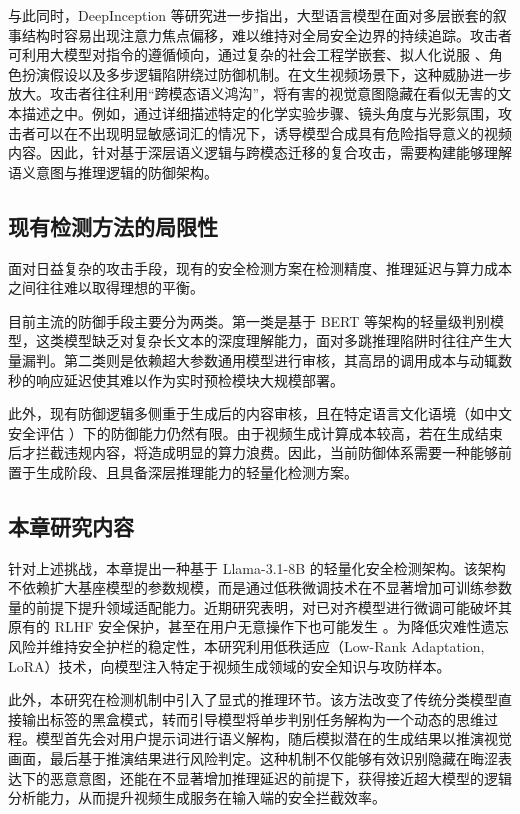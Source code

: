 与此同时，DeepInception 等研究进一步指出，大型语言模型在面对多层嵌套的叙事结构时容易出现注意力焦点偏移，难以维持对全局安全边界的持续追踪。攻击者可利用大模型对指令的遵循倾向，通过复杂的社会工程学嵌套、拟人化说服 \cite{zeng2024johnny}、角色扮演假设以及多步逻辑陷阱绕过防御机制。在文生视频场景下，这种威胁进一步放大。攻击者往往利用“跨模态语义鸿沟”，将有害的视觉意图隐藏在看似无害的文本描述之中。例如，通过详细描述特定的化学实验步骤、镜头角度与光影氛围，攻击者可以在不出现明显敏感词汇的情况下，诱导模型合成具有危险指导意义的视频内容。因此，针对基于深层语义逻辑与跨模态迁移的复合攻击，需要构建能够理解语义意图与推理逻辑的防御架构。

\subsection{现有检测方法的局限性} 

面对日益复杂的攻击手段，现有的安全检测方案在检测精度、推理延迟与算力成本之间往往难以取得理想的平衡。

目前主流的防御手段主要分为两类。第一类是基于 BERT 等架构的轻量级判别模型，这类模型缺乏对复杂长文本的深度理解能力，面对多跳推理陷阱时往往产生大量漏判。第二类则是依赖超大参数通用模型进行审核，其高昂的调用成本与动辄数秒的响应延迟使其难以作为实时预检模块大规模部署。

此外，现有防御逻辑多侧重于生成后的内容审核，且在特定语言文化语境（如中文安全评估 \cite{wang2024chinese}）下的防御能力仍然有限。由于视频生成计算成本较高，若在生成结束后才拦截违规内容，将造成明显的算力浪费。因此，当前防御体系需要一种能够前置于生成阶段、且具备深层推理能力的轻量化检测方案。

\subsection{本章研究内容} 

针对上述挑战，本章提出一种基于 Llama-3.1-8B 的轻量化安全检测架构。该架构不依赖扩大基座模型的参数规模，而是通过低秩微调技术在不显著增加可训练参数量的前提下提升领域适配能力。近期研究表明，对已对齐模型进行微调可能破坏其原有的 RLHF 安全保护，甚至在用户无意操作下也可能发生 \cite{qi2023fine, zhan2024removing}。为降低灾难性遗忘风险并维持安全护栏的稳定性，本研究利用低秩适应（Low-Rank Adaptation, LoRA）技术，向模型注入特定于视频生成领域的安全知识与攻防样本。

此外，本研究在检测机制中引入了显式的推理环节。该方法改变了传统分类模型直接输出标签的黑盒模式，转而引导模型将单步判别任务解构为一个动态的思维过程。模型首先会对用户提示词进行语义解构，随后模拟潜在的生成结果以推演视觉画面，最后基于推演结果进行风险判定。这种机制不仅能够有效识别隐藏在晦涩表达下的恶意意图，还能在不显著增加推理延迟的前提下，获得接近超大模型的逻辑分析能力，从而提升视频生成服务在输入端的安全拦截效率。


